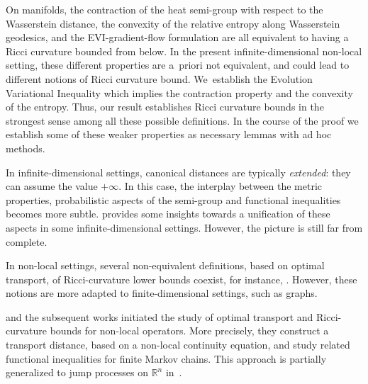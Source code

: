 \documentclass[JEP,XML,SOM,Unicode,published]{cedram}
\theoremstyle{definition}
\theoremstyle{remark}
\begin{document}
On manifolds, the contraction of the heat semi-group with respect to the Wasserstein distance, the convexity of the relative entropy along Wasserstein geodesics, and the EVI-gradient-flow formulation are all equivalent to having a Ricci curvature bounded from below.
In the present infinite-dimensional non-local setting, these different properties are a~priori not equivalent, and could lead to different notions of Ricci curvature bound. We~establish the Evolution Variational Inequality which implies the contraction property and the convexity of the entropy.
Thus, our result establishes Ricci curvature bounds in the strongest sense among all these possible definitions.
In the course of the proof we establish some of these weaker properties as necessary lemmas with ad hoc methods.

In infinite-dimensional settings, canonical distances are typically \emph{extended}: they can assume the value $+\infty$.
In this case, the interplay between the metric properties, probabilistic aspects of the semi-group and functional inequalities becomes more subtle.
\cite{AmbrosioErbarSavare} provides some insights towards a unification of these aspects in some infinite-dimensional settings.
However, the picture is still far from complete.

In non-local settings, several non-equivalent definitions, based on optimal transport, of Ricci-curvature lower bounds coexist, for instance, \cite{Ollivier,GRSTCurvature,Samson,Maas}.
However, these notions are more adapted to finite-dimensional settings, such as graphs.

\cite{Maas,Mielke} and the subsequent works \cite{ErbarMaas,FathiMaas} initiated the study of opti\-mal transport and Ricci-curvature bounds for non-local operators.
More precisely, they construct a transport distance, based on a non-local continuity equation, and study related functional inequalities for finite Markov chains.
This approach is partially generalized to jump processes on $\mathbb{R}^{n}$ in~\cite{Erbar}.
\end{document}
